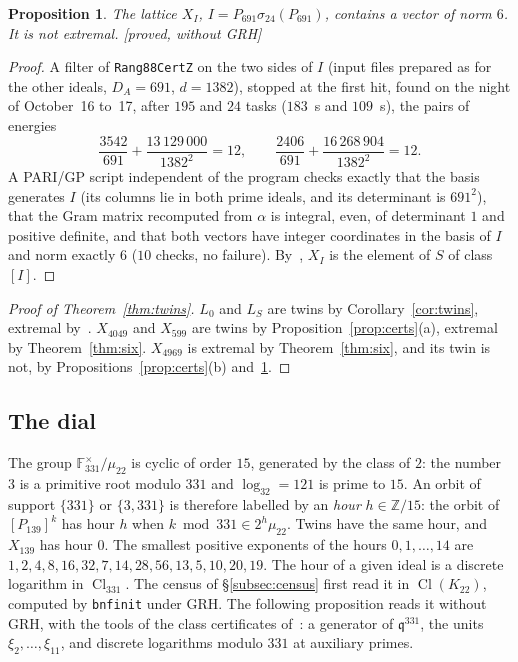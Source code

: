\documentclass[11pt,a4paper]{amsart}
\theoremstyle{plain}
\newtheorem{proposition}{Proposition}[section]
\theoremstyle{definition}
\newcommand{\Z}{\mathbb{Z}}
\newcommand{\F}{\mathbb{F}}
\newcommand{\q}{\mathfrak{q}}
\DeclareMathOperator{\Cl}{Cl}
\newcommand{\Lz}{L_{0}}
\newcommand{\LS}{L_{S}}
\newcommand{\st}[1]{\textup{\textsf{\small[#1]}}}
\begin{document}
\begin{proposition}\label{prop:temoin}
The lattice $X_I$, $I=P_{691}\sigma_{24}(P_{691})$, contains a vector of norm $6$. It is not extremal. \st{proved, without GRH}
\end{proposition}

\begin{proof}
A filter of \texttt{Rang88CertZ} on the two sides of $I$ (input files prepared as for the other ideals, $D_A=691$, $d=1382$), stopped at the first hit, found on the night of October~16 to~17, after $195$ and $24$ tasks ($183$~s and $109$~s), the pairs of energies
\[
\frac{3542}{691}+\frac{13\,129\,000}{1382^2}=12,\qquad \frac{2406}{691}+\frac{16\,268\,904}{1382^2}=12 .
\]
A PARI/GP script independent of the program checks exactly that the basis generates $I$ (its columns lie in both prime ideals, and its determinant is $691^2$), that the Gram matrix recomputed from $\alpha$ is integral, even, of determinant $1$ and positive definite, and that both vectors have integer coordinates in the basis of $I$ and norm exactly $6$ ($10$ checks, no failure). By~\cite[Prop.~2.3(b)]{Gau26}, $X_I$ is the element of $S$ of class $[I]$.
\end{proof}

\begin{proof}[Proof of Theorem~\ref{thm:twins}]
$\Lz$ and $\LS$ are twins by Corollary~\ref{cor:twins}, extremal by~\cite{Sak26}. $X_{4049}$ and $X_{599}$ are twins by Proposition~\ref{prop:certs}(a), extremal by Theorem~\ref{thm:six}. $X_{4969}$ is extremal by Theorem~\ref{thm:six}, and its twin is not, by Propositions~\ref{prop:certs}(b) and~\ref{prop:temoin}.
\end{proof}

\subsection{The dial}\label{subsec:dial}
The group $\F_{331}^\times/\mu_{22}$ is cyclic of order $15$, generated by the class of $2$: the number $3$ is a primitive root modulo $331$ and $\log_32=121$ is prime to $15$. An orbit of support $\{331\}$ or $\{3,331\}$ is therefore labelled by an \emph{hour} $h\in\Z/15$: the orbit of $[P_{139}]^k$ has hour $h$ when $k\bmod331\in2^h\mu_{22}$. Twins have the same hour, and $X_{139}$ has hour $0$. The smallest positive exponents of the hours $0,1,\dots,14$ are $1,2,4,8,16,32,7,14,28,56,13,5,10,20,19$. The hour of a given ideal is a discrete logarithm in $\Cl_{331}$. The census of \S\ref{subsec:census} first read it in $\Cl(K_{22})$, computed by \texttt{bnfinit} under GRH. The following proposition reads it without GRH, with the tools of the class certificates of~\cite[\S6.4]{Gau26}: a generator of $\q^{331}$, the units $\xi_2,\dots,\xi_{11}$, and discrete logarithms modulo $331$ at auxiliary primes.
\end{document}
